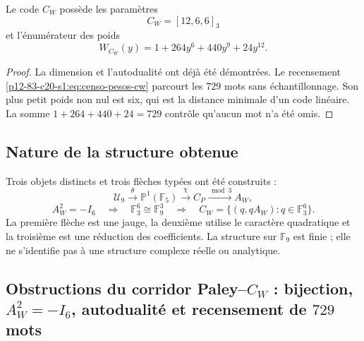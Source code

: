 \begin{theorem}
\label{p12-83-c20-s1:thm:enumerador-cw-autonomo}
Le code \(C_W\) possède les paramètres
\[
 \boxed{C_W=[12,6,6]_3}
\]
et l'énumérateur des poids
\begin{equation}
 \boxed{W_{C_W}(y)=1+264y^6+440y^9+24y^{12}.}
 \label{p12-83-c20-s1:eq:enumerador-pesos-cw}
\end{equation}
\end{theorem}

\begin{proof}
La dimension et l'autodualité ont déjà été démontrées. Le recensement
\eqref{p12-83-c20-s1:eq:censo-pesos-cw} parcourt les \(729\) mots sans échantillonnage. Son
plus petit poids non nul est six, qui est la distance minimale d'un code linéaire.
La somme \(1+264+440+24=729\) contrôle qu'aucun mot n'a été omis.
\end{proof}

\subsection{Nature de la structure obtenue}

Trois objets distincts et trois flèches typées ont été construits :
\[
 \mathcal U_9
 \xrightarrow{\theta}\mathbb P^1(\mathbb F_5)
 \xrightarrow{\chi}C_P
 \xrightarrow{\bmod3}A_W,
\]
\[
 A_W^2=-I_6
 \quad\Longrightarrow\quad
 \mathbb F_3^6\cong\mathbb F_9^3
 \quad\Longrightarrow\quad
 C_W=\{(q,qA_W):q\in\mathbb F_3^6\}.
\]
La première flèche est une jauge, la deuxième utilise le caractère quadratique et la
troisième est une réduction des coefficients. La structure sur
\(\mathbb F_9\) est finie ; elle ne s'identifie pas à une structure complexe
réelle ou analytique.

\subsection{Obstructions du corridor Paley–\(C_W\) : bijection, \(A_W^2=-I_6\), autodualité et recensement de \(729\) mots}

